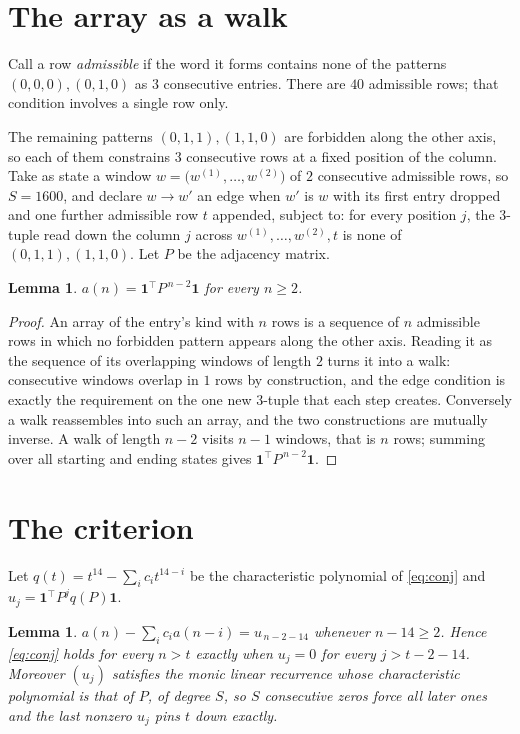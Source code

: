 \documentclass[11pt,a4paper]{article}
\theoremstyle{plain}
\newtheorem{lemma}[theorem]{Lemma}
\theoremstyle{definition}
\begin{document}
\section{The array as a walk}

Call a row \emph{admissible} if the word it forms contains none of the patterns
$(0,0,0), (0,1,0)$ as $3$ consecutive entries. There are $40$ admissible rows; that condition
involves a single row only.

The remaining patterns $(0,1,1), (1,1,0)$ are forbidden along the other axis, so each of them
constrains $3$ consecutive rows at a fixed position of the column. Take as state a
window $w=\bigl(w^{(1)},\dots,w^{(2)}\bigr)$ of $2$ consecutive admissible
rows, so $S=1600$, and declare $w\to w'$ an edge when $w'$ is $w$ with its first entry
dropped and one further admissible row $t$ appended, subject to: for every position
$j$, the $3$-tuple read down the column $j$ across $w^{(1)},\dots,w^{(2)},t$
is none of $(0,1,1), (1,1,0)$. Let $P$ be the adjacency matrix.

\begin{lemma}\label{lem:walk}
$a(n)=\mathbf{1}^{\!\top}P^{\,n-2}\mathbf{1}$ for every $n\ge2$.
\end{lemma}

\begin{proof}
An array of the entry's kind with $n$ rows is a sequence of $n$ admissible rows in
which no forbidden pattern appears along the other axis. Reading it as the sequence of its
overlapping windows of length $2$ turns it into a walk: consecutive windows overlap in
$1$ rows by construction, and the edge condition is exactly the requirement on the one
new $3$-tuple that each step creates. Conversely a walk reassembles into such an array,
and the two constructions are mutually inverse. A walk of length $n-2$ visits $n-1$
windows, that is $n$ rows; summing over all starting and ending states gives
$\mathbf{1}^{\!\top}P^{\,n-2}\mathbf{1}$.
\end{proof}

\section{The criterion}

Let $q(t)=t^{14}-\sum_i c_i t^{14-i}$ be the characteristic polynomial of
\eqref{eq:conj} and $u_j=\mathbf{1}^{\!\top}P^{j}q(P)\mathbf{1}$.

\begin{lemma}\label{lem:crit}
$a(n)-\sum_i c_i a(n-i)=u_{\,n-2-14}$ whenever $n-14\ge2$. Hence
\eqref{eq:conj} holds for every $n>t$ exactly when $u_j=0$ for every
$j>t-2-14$. Moreover $(u_j)$ satisfies the monic linear recurrence whose
characteristic polynomial is that of $P$, of degree $S$, so $S$ consecutive zeros force all
later ones and the last nonzero $u_j$ pins $t$ down exactly.
\end{lemma}
\end{document}
